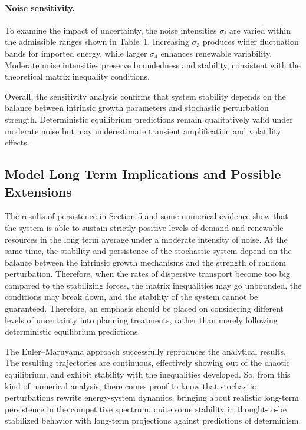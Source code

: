 \documentclass[11pt]{article}
\numberwithin{equation}{section}
\begin{document}
\paragraph{Noise sensitivity.}
To examine the impact of uncertainty, the noise intensities $\sigma_i$ are varied within the admissible ranges shown in Table~1. Increasing $\sigma_3$ produces wider fluctuation bands for imported energy, while larger $\sigma_4$ enhances renewable variability. Moderate noise intensities preserve boundedness and stability, consistent with the theoretical matrix inequality conditions.

Overall, the sensitivity analysis confirms that system stability depends on the balance between intrinsic growth parameters and stochastic perturbation strength. Deterministic equilibrium predictions remain qualitatively valid under moderate noise but may underestimate transient amplification and volatility effects.

\subsection{Model Long Term Implications and Possible Extensions }
The results of persistence in Section 5 and some numerical evidence show that the system is able to sustain strictly positive levels of demand and renewable resources in the long term average under a moderate intensity of noise. At the same time, the stability and persistence of the stochastic system depend on the balance between the intrinsic growth mechanisms and the strength of random perturbation. Therefore, when the rates of dispersive transport become too big compared to the stabilizing forces, the matrix inequalities may go unbounded, the conditions may break down, and the stability of the system cannot be guaranteed. Therefore, an emphasis should be placed on considering different levels of uncertainty into planning treatments, rather than merely following deterministic equilibrium predictions.

The Euler–Maruyama approach successfully reproduces the analytical results. The resulting trajectories are continuous, effectively showing out of the chaotic equilibrium, and exhibit stability with the inequalities developed. So, from this kind of numerical analysis, there comes proof to know that stochastic perturbations rewrite energy-system dynamics, bringing about realistic long-term persistence in the competitive spectrum, quite some stability in thought-to-be stabilized behavior with long-term projections against predictions of determinism.
\end{document}
